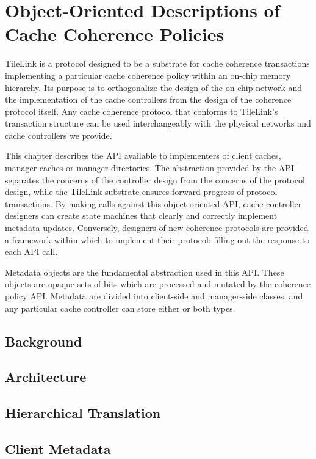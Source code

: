 \chapter{Object-Oriented Descriptions of Cache Coherence Policies}
\label{c.coherence}


TileLink is a protocol designed to be a substrate for cache coherence transactions implementing a particular cache coherence policy within an on-chip memory hierarchy. 
Its purpose is to orthogonalize the design of the on-chip network 
and the implementation of the cache controllers from the design of the coherence protocol itself.
Any cache coherence protocol that conforms to TileLink’s transaction structure 
can be used interchangeably with the physical networks and cache controllers we provide.

This chapter describes the API available to implementers of client caches, 
manager caches or manager directories. 
The abstraction provided by the API separates the concerns of the controller design
from the concerns of the protocol design, 
while the TileLink substrate ensures forward progress of protocol transactions. 
By making calls against this object-oriented API, cache controller designers can
create state machines that clearly and correctly implement metadata updates. 
Conversely, designers of new coherence protocols are provided a framework
within which to implement their protocol: filling out the response to each API call.

Metadata objects are the fundamental abstraction used in this API.
These objects are opaque sets of bits which are processed and mutated by the coherence policy API.
Metadata are divided into client-side and manager-side classes,
and any particular cache controller can store either or both types.

\section{Background} 

\section{Architecture} 

\section{Hierarchical Translation}

\section{Client Metadata} 

